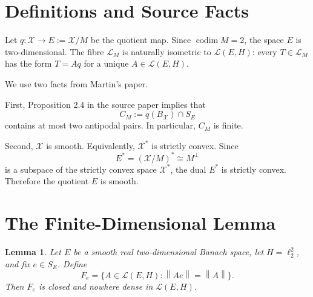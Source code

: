 \documentclass[11pt]{article}
\newtheorem{lemma}{Lemma}
\newcommand{\X}{\mathcal X}
\newcommand{\calL}{\mathcal L}
\newcommand{\codim}{\operatorname{codim}}
\newcommand{\norm}[1]{\left\lVert #1 \right\rVert}
\begin{document}
\section*{Definitions and Source Facts}

Let \(q:\X\to E:=\X/M\) be the quotient map. Since \(\codim M=2\), the space
\(E\) is two-dimensional. The fibre \(\calL_M\) is naturally isometric to
\(\calL(E,H)\): every \(T\in\calL_M\) has the form \(T=Aq\) for a unique
\(A\in\calL(E,H)\).

We use two facts from Martin's paper.

First, Proposition 2.4 in the source paper implies that
\[
  C_M:=q(B_\X)\cap S_E
\]
contains at most two antipodal pairs. In particular, \(C_M\) is finite.

Second, \(\X\) is smooth. Equivalently, \(\X^*\) is strictly convex. Since
\[
  E^*=(\X/M)^* \cong M^\perp
\]
is a subspace of the strictly convex space \(\X^*\), the dual \(E^*\) is
strictly convex. Therefore the quotient \(E\) is smooth.

\section*{The Finite-Dimensional Lemma}

\begin{lemma}\label{lem:fixed-point-nowhere-dense}
Let \(E\) be a smooth real two-dimensional Banach space, let
\(H=\ell_2^2\), and fix \(e\in S_E\). Define
\[
  F_e=\{A\in\calL(E,H): \norm{Ae}=\norm{A}\}.
\]
Then \(F_e\) is closed and nowhere dense in \(\calL(E,H)\).
\end{lemma}
\end{document}
